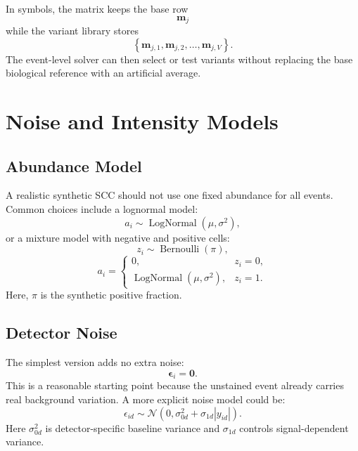 \documentclass[11pt]{article}
\newcommand{\m}{\mathbf{m}}
\newcommand{\eps}{\boldsymbol{\epsilon}}
\begin{document}
In symbols, the matrix keeps the base row
\begin{equation}
  \m_j
\end{equation}
while the variant library stores
\begin{equation}
  \left\{
    \m_{j,1},
    \m_{j,2},
    \ldots,
    \m_{j,V}
  \right\}.
\end{equation}
The event-level solver can then select or test variants without replacing the
base biological reference with an artificial average.

\section{Noise and Intensity Models}

\subsection{Abundance Model}

A realistic synthetic SCC should not use one fixed abundance for all events.
Common choices include a lognormal model:
\begin{equation}
  a_i \sim \operatorname{LogNormal}(\mu,\sigma^2),
\end{equation}
or a mixture model with negative and positive cells:
\begin{equation}
  z_i \sim \operatorname{Bernoulli}(\pi),
\end{equation}
\begin{equation}
  a_i =
  \begin{cases}
    0, & z_i = 0, \\
    \operatorname{LogNormal}(\mu,\sigma^2), & z_i = 1.
  \end{cases}
\end{equation}
Here, \(\pi\) is the synthetic positive fraction.

\subsection{Detector Noise}

The simplest version adds no extra noise:
\begin{equation}
  \eps_i = \mathbf{0}.
\end{equation}
This is a reasonable starting point because the unstained event already carries
real background variation. A more explicit noise model could be:
\begin{equation}
  \epsilon_{id}
  \sim
  \mathcal{N}
  \left(
    0,
    \sigma_{0d}^{2}
    +
    \sigma_{1d}
    \left|
      y_{id}
    \right|
  \right).
\end{equation}
Here \(\sigma_{0d}^{2}\) is detector-specific baseline variance and
\(\sigma_{1d}\) controls signal-dependent variance.
\end{document}
